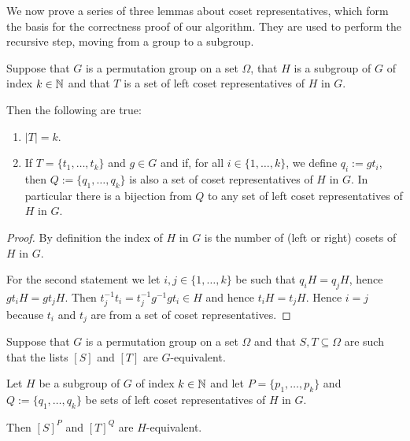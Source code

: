 We now prove a series of three lemmas about coset representatives, which form
the basis for the correctness proof of our algorithm. They are used to perform
the recursive step, moving from a group to a subgroup.

\begin{lem}\label{rep}
Suppose that $G$ is a permutation group on a set \(\Omega\), that \(H\) is a
subgroup of \(G\) of index $k \in \mathbb{N}$ and that $T$ is a set of left coset
representatives of $H$ in $G$.

Then the following are true:

\begin{enumerate}

\item $|T|=k$.

\item If $T=\{t_1,\dots,t_k\}$ and $g \in G$ and if, for all $i \in \{1,\dots,k\}$,
we define $q_i:=gt_i$, then $Q:=\{q_1,\dots,q_k\}$ is also a set of coset
representatives of $H$ in $G$. In particular there is a bijection from $Q$ to
any set of left coset representatives of $H$ in $G$.

\end{enumerate}
\end{lem}

\begin{proof}
By definition the index of $H$ in $G$ is the number of (left or right) cosets of $H$ in $G$.

For the second statement we let $i,j \in \{1,\dots,k\}$ be such that $q_iH=q_jH$,
hence $gt_iH=gt_jH$. Then $t_j^{-1}t_i=t_j^{-1}g^{-1}gt_i \in H$ and hence
$t_iH=t_jH$. Hence $i=j$ because $t_i$ and $t_j$ are from a set of coset
representatives.
\end{proof}

\begin{lem}\label{equi-buildup}
Suppose that $G$ is a permutation group on a set \(\Omega\) and that $S,T
\subseteq \Omega$ are such that the lists $[S]$ and $[T]$ are $G$-equivalent.

Let \(H\) be a subgroup of \(G\) of index $k \in \mathbb{N}$ and let $P=\{p_1,\dots,p_k\}$
and $Q:=\{q_1,\dots,q_k\}$ be sets of left coset representatives of $H$ in $G$.

Then $[S]^P$ and $[T]^Q$ are \(H\)-equivalent.
\end{lem}

